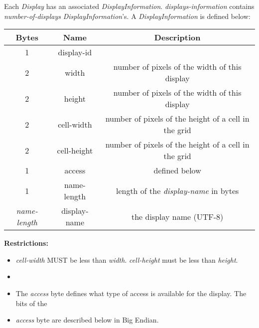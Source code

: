 \documentclass{article}
\begin{document}
    Each \emph{Display} has an associated \emph{DisplayInformation}. \emph{displays-information} contains
    \emph{number-of-displays} \emph{DisplayInformation}'s. A \emph{DisplayInformation} is defined below:

    \begin{center}
        \begin{tabular}{|c|c|c|}
            \hline
            \textbf{Bytes}     & \textbf{Name} & \textbf{Description}                                 \\
            \hline
            1                  & display-id    &                                                      \\
            \hline
            2                  & width         & number of pixels of the width of this display        \\
            \hline
            2                  & height        & number of pixels of the width of this display        \\
            \hline
            2                  & cell-width    & number of pixels of the height of a cell in the grid \\
            \hline
            2                  & cell-height   & number of pixels of the height of a cell in the grid \\
            \hline
            1                  & access        & defined below                                        \\
            \hline
            1                  & name-length   & length of the \emph{display-name} in bytes           \\
            \hline
            \emph{name-length} & display-name  & the display name (UTF-8)                             \\
            \hline
        \end{tabular}
    \end{center}

    \textbf{Restrictions:}

    \begin{itemize}
        \item \emph{cell-width} MUST be less than \emph{width}. \emph{cell-height} must be less than \emph{height}.\\
        \item %
        \item The \emph{access} byte defines what type of access is available for the display. The bits of the
        \item \emph{access} byte are described below in Big Endian.
    \end{itemize}
\end{document}
